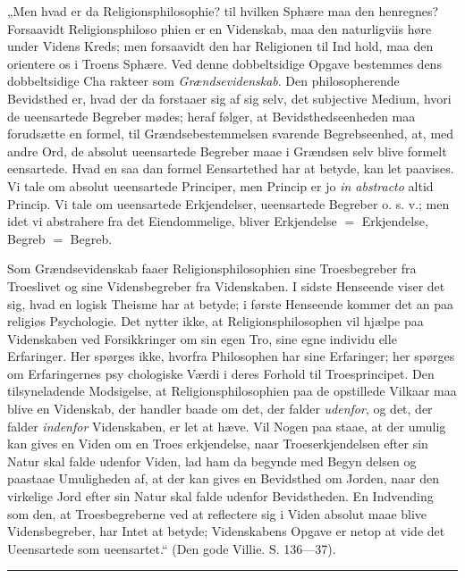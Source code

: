 \documentclass[12pt]{book}
\newcommand{\opage}[1]{\marginnote{\footnotesize\textit{[#1]}}}
\begin{document}
„Men hvad er da Religionsphilosophie? til hvilken
Sphære maa den henregnes? Forsaavidt Religionsphiloso\-%
phien er en Videnskab, maa den naturligviis høre under
Videns Kreds; men forsaavidt den har Religionen til Ind\-%
\opage{254}\setcounter{footnote}{0}%
hold, maa den orientere os i Troens Sphære. Ved denne
dobbeltsidige Opgave bestemmes dens dobbeltsidige Cha\-%
rakteer som \emph{Grændsevidenskab}. Den philosopherende
Bevidsthed er, hvad der da forstaaer sig af sig selv, det
subjective Medium, hvori de ueensartede Begreber mødes;
heraf følger, at Bevidsthedseenheden maa forudsætte en
formel, til Grændsebestemmelsen svarende Begrebseenhed,
at, med andre Ord, de absolut ueensartede Begreber maae
i Grændsen selv blive formelt eensartede. Hvad en saa\-%
dan formel Eensartethed har at betyde, kan let paavises.
Vi tale om absolut ueensartede Principer, men Princip
er jo \textit{in abstracto} altid Princip. Vi tale om ueensartede
Erkjendelser, ueensartede Begreber o. s. v.; men idet vi
abstrahere fra det Eiendommelige, bliver Erkjendelse $=$
Erkjendelse, Begreb $=$ Begreb.

Som Grændsevidenskab faaer Religionsphilosophien
sine Troesbegreber fra Troeslivet og sine Vidensbegreber
fra Videnskaben. I sidste Henseende viser det sig, hvad
en logisk Theisme har at betyde; i første Henseende
kommer det an paa religiøs Psychologie. Det nytter
ikke, at Religionsphilosophen vil hjælpe paa Videnskaben
ved Forsikkringer om sin egen Tro, sine egne individu\-%
elle Erfaringer. Her spørges ikke, hvorfra Philosophen
har sine Erfaringer; her spørges om Erfaringernes psy\-%
chologiske Værdi i deres Forhold til Troesprincipet. Den
tilsyneladende Modsigelse, at Religionsphilosophien paa
de opstillede Vilkaar maa blive en Videnskab, der handler
baade om det, der falder \emph{udenfor}, og det, der falder
\emph{indenfor} Videnskaben, er let at hæve. Vil Nogen paa\-%
staae, at der umulig kan gives en Viden om en Troes\-%
erkjendelse, naar Troeserkjendelsen efter sin Natur skal
falde udenfor Viden, lad ham da begynde med Begyn\-%
delsen og paastaae Umuligheden af, at der kan gives en
\opage{255}\setcounter{footnote}{0}%
Bevidsthed om Jorden, naar den virkelige Jord efter sin
Natur skal falde udenfor Bevidstheden. En Indvending
som den, at Troesbegreberne ved at reflectere sig i Viden
absolut maae blive Vidensbegreber, har Intet at betyde;
Videnskabens Opgave er netop at vide det Ueensartede
som ueensartet.“ (Den gode Villie. S. 136---37).

\begin{center}\rule{3cm}{0.4pt}\end{center}
\end{document}
